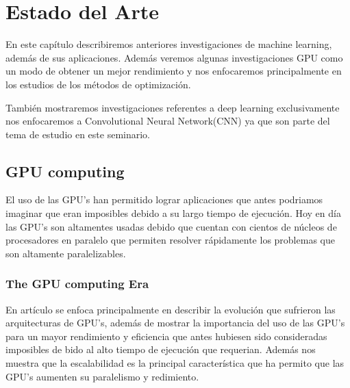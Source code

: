 \chapter{Estado del Arte}
En este capítulo describiremos anteriores investigaciones de machine learning, además de sus aplicaciones. Además veremos algunas investigaciones GPU como un modo de obtener un mejor rendimiento y nos enfocaremos principalmente en los estudios de los métodos de optimización.

También mostraremos investigaciones referentes a deep learning exclusivamente nos enfocaremos a Convolutional Neural Network(CNN) ya que son parte del tema de estudio en este seminario. 





\section{GPU computing}
El uso de las GPU's han permitido lograr aplicaciones que antes podriamos imaginar que eran imposibles debido a su largo tiempo de ejecución. Hoy en día las GPU's son altamentes usadas debido que cuentan con cientos de núcleos de procesadores en paralelo que permiten resolver rápidamente los problemas que son altamente paralelizables.
\subsection{The GPU computing Era}
	En artículo se enfoca principalmente en describir la evolución que sufrieron las arquitecturas de GPU's, además de mostrar la importancia del uso de las GPU's para un mayor rendimiento y eficiencia que antes hubiesen sido consideradas imposibles de	bido al alto tiempo de ejecución que requerian. Además nos muestra que la escalabilidad es la principal característica que ha permito que las GPU's aumenten su paralelismo y redimiento.
